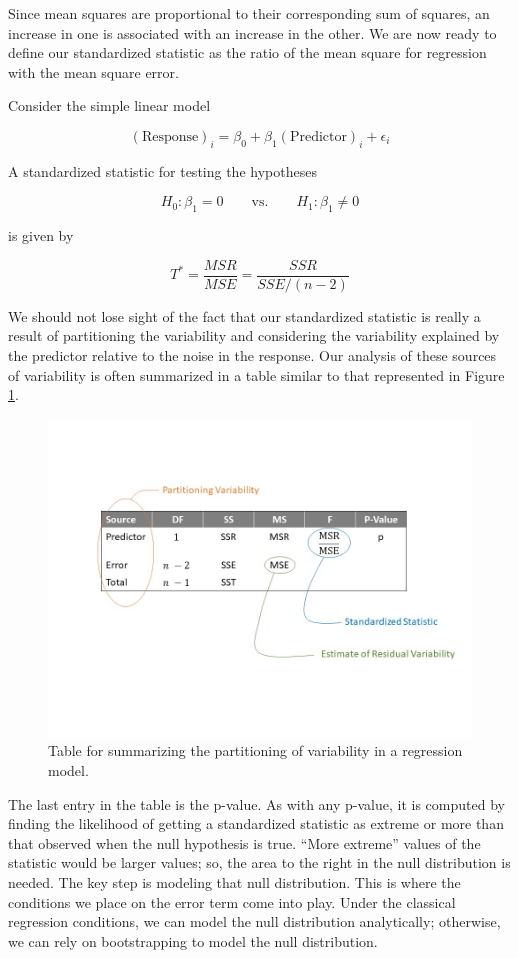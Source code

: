 \documentclass[]{book}
\theoremstyle{plain}
\theoremstyle{mydefn}
\theoremstyle{myexmpl}
\theoremstyle{remark}
\let\BeginKnitrBlock\begin \let\EndKnitrBlock\end
\let\BeginKnitrBlock\begin \let\EndKnitrBlock\end
\begin{document}
Since mean squares are proportional to their corresponding sum of
squares, an increase in one is associated with an increase in the other.
We are now ready to define our standardized statistic as the ratio of
the mean square for regression with the mean square error.

\BeginKnitrBlock{rmdkeyidea}
Consider the simple linear model

\[(\text{Response})_i = \beta_0 + \beta_1(\text{Predictor})_i + \epsilon_i\]

A standardized statistic for testing the hypotheses

\[H_0: \beta_1 = 0 \qquad \text{vs.} \qquad H_1: \beta_1 \neq 0\]

is given by

\[T^* = \frac{MSR}{MSE} = \frac{SSR}{SSE/(n-2)}\]
\EndKnitrBlock{rmdkeyidea}

We should not lose sight of the fact that our standardized statistic is
really a result of partitioning the variability and considering the
variability explained by the predictor relative to the noise in the
response. Our analysis of these sources of variability is often
summarized in a table similar to that represented in Figure
\ref{fig:regquality-ANOVA-Table}.

\begin{figure}

{\centering \includegraphics[width=0.8\linewidth]{./images/RegQuality-ANOVA-Table} 

}

\caption{Table for summarizing the partitioning of variability in a regression model.}\label{fig:regquality-ANOVA-Table}
\end{figure}

The last entry in the table is the p-value. As with any p-value, it is
computed by finding the likelihood of getting a standardized statistic
as extreme or more than that observed when the null hypothesis is true.
``More extreme'' values of the statistic would be larger values; so, the
area to the right in the null distribution is needed. The key step is
modeling that null distribution. This is where the conditions we place
on the error term come into play. Under the classical regression
conditions, we can model the null distribution analytically; otherwise,
we can rely on bootstrapping to model the null distribution.
\end{document}
